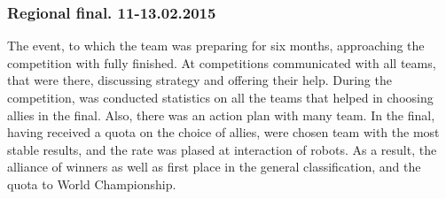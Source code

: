 	\subsubsection{Regional final. 11-13.02.2015}	
		The event, to which the team was preparing for six months, approaching the competition with fully finished. At competitions communicated with all teams, that were there, discussing strategy and offering their help. During the competition, was conducted statistics on all the teams that helped in choosing allies in the final. Also, there was an action plan with many team. In the final, having received a quota on the choice of allies, were chosen team with the most stable results, and the rate was plased at interaction of robots. As a result, the alliance of winners as well as first place in the general classification, and the quota to World Championship.
		\begin{figure}[H]
			\\
		\end{figure}
	\newpage			
